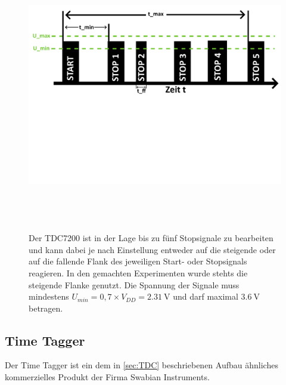 \begin{figure}
  \centering
  \includegraphics[width=16cm, height=12cm]{content/bilder/ZeitstrukturTDC.pdf}
  \caption{Der TDC7200 ist in der Lage bis zu fünf Stopsignale zu bearbeiten und kann dabei je nach 
    Einstellung entweder auf die steigende oder auf die fallende Flank des jeweiligen Start- oder
    Stopsignals reagieren. In den gemachten Experimenten wurde stehts die steigende Flanke genutzt. Die
    Spannung der Signale muss mindestens $U_{min}=0,7\times V_{DD}=\SI{2,31}{\volt}$ und darf maximal 
    $\SI{3,6}{\volt}$ betragen. } 
  \label{fig:zeitstrukturTDC}
\end{figure}

\subsection{Time Tagger}
\label{sec:TimeTagger}
Der Time Tagger ist ein dem in \autoref{sec:TDC} beschriebenen Aufbau ähnliches kommerzielles Produkt
der Firma Swabian Instruments.